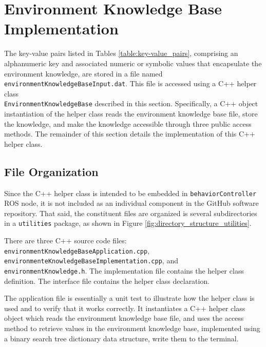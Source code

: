 \documentclass{CSSRforAfrica}
\begin{document}
\newpage
\section{Environment Knowledge Base Implementation}
\label{section:implementation}

The key-value pairs listed in Tables \ref{table:key-value_pairs}, comprising an alphanumeric key and associated  numeric or symbolic values that encapsulate the environment knowledge, are stored in a file named\\ {\tt \small environmentKnowledgeBaseInput.dat}.  This file is accessed using a C++ helper class \\{\tt \small EnvironmentKnowledgeBase} described in this section.  Specifically, a C++ object instantiation of  the helper class  reads the environment knowledge base file, store the knowledge, and make the knowledge accessible through three public access methods. The remainder of this section details the implementation of this C++ helper class.
 

\subsection{File Organization}

Since the C++ helper class is intended to be embedded in {\small \tt behaviorController} ROS node, it is not included as an individual component in the GitHub software repository.
That said, the constituent files are organized is several subdirectories in a {\small \tt utilities} package, as shown in Figure \ref{fig:directory_structure_utilities}. 

There are three C++ source code files:
{\small \tt environmentKnowledgeBaseApplication.cpp}, \\
{\small \tt environmenteKnowledgeBaseImplementation.cpp}, and 
{\small \tt environmentKnowledge.h}.  The implementation file contains the helper class definition. The interface file contains the helper class declaration. 

The application file is essentially a unit test to illustrate how the helper class is used and to verify that it works correctly. It instantiates a C++ helper class object which reads the environment knowledge base file, and uses the access method to retrieve  values in  the  environment knowledge base, implemented using a binary search tree dictionary data structure, write them to the terminal.
\end{document}
